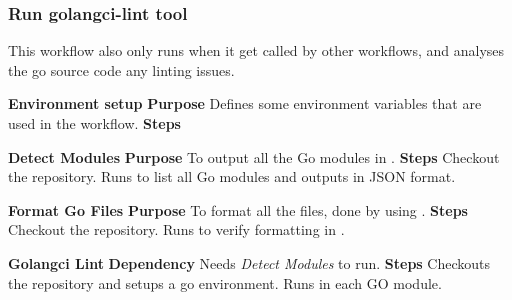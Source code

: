 \subsubsection{Run golangci-lint tool}
This workflow also only runs when it get called by other workflows, and analyses the go source code any linting issues.
\begin{comment}
\begin{outline}[enumerate]
    \1 \textbf{Environment setup}
        \2 defines the \code{GO_VERSION} to be stable and \code{GOLANGCI_LINT_VERSION}
    \1 test
\end{outline}
\end{comment}
\begin{outline}[enumerate]
    \1 \textbf{Environment setup}
        \2 \textbf{Purpose}
            \3 Defines some environment variables that are used in the workflow.
        \2 \textbf{Steps}
            \3 
            \3 

            
    \1 \textbf{Detect Modules}
        \2 \textbf{Purpose}
            \3 To output all the Go modules in .
        \2 \textbf{Steps}
            \3 Checkout the repository.
            \3 Runs  to list all Go modules and outputs in JSON format. 
    
    \1 \textbf{Format Go Files}
        \2 \textbf{Purpose}
            \3 To format all the  files, done by using .
        \2 \textbf{Steps}
            \3 Checkout the repository.
            \3 Runs  to verify formatting in .

            
    \1 \textbf{Golangci Lint}
        \2 \textbf{Dependency}
            \3 Needs \textit{Detect Modules} to run.
        \2 \textbf{Steps}
            \3 Checkouts the repository and setups a go environment.
            \3 Runs  in each GO module.
\end{outline}
